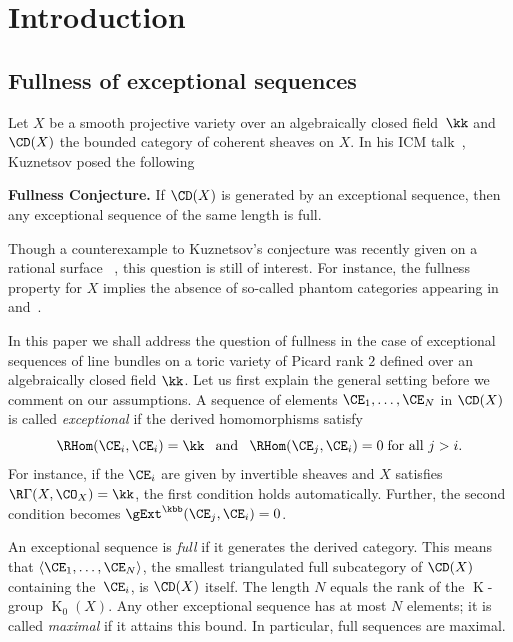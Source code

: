 \section{Introduction}
\label{sec:Intro}

\subsection{Fullness of exceptional sequences}
\label{subsubsec:ExExSeq}
Let $X$ be a smooth projective variety over 
{an algebraically closed field~$\kk$} 
and $\CD(X)$ the bounded category of coherent sheaves 
on $X$. In his ICM talk~\cite{KuznetsovICM}, 
Kuznetsov posed the following

\smallskip 

{\bf Fullness Conjecture.} 
If $\CD(X)$ is generated by an exceptional sequence, 
then any exceptional sequence of the same length is full.

 \smallskip

{Though a counterexample to Kuznetsov's conjecture 
was recently given on a rational surface {~\cite{krah}}, 
this question is still of interest. {For instance, the 
fullness property for $X$} implies the absence of so-called phantom 
categories appearing in~\cite{phantomsGalkin1} and~\cite{Phantom}.}

{In this paper we shall address the question of 
fullness in the case of exceptional sequences of 
line bundles on a toric 
variety of Picard rank $2$ defined over an 
algebraically closed field $\kk$.}
Let us first explain the general setting before we
comment on our assumptions. A sequence of elements 
$\CE_1,\ldots,\CE_N$ in $\CD(X)$ is called 
{\em exceptional} {{if} the derived homomorphisms 
satisfy 
$$
\RHom(\CE_i,\CE_i)=\kk\hspace{0.8em}\mbox{and}\hspace{0.8em}
\RHom(\CE_j,\CE_i)=0\;\mbox{for all }j>i.
$$}For instance, if the $\CE_i$ are 
given by invertible sheaves and $X$ 
satisfies \mbox{$\R\Gamma(X,\CO_X)=\kk$}, the first 
condition holds automatically. Further, the 
second condition becomes $\gExt^\kbb(\CE_j,\CE_i)=0$.

An exceptional sequence is {\em full} if it 
generates the derived category. This means that 
$\langle\CE_1,\ldots,\CE_N\rangle$, the smallest 
triangulated full subcategory of $\CD(X)$ 
containing the~$\CE_i$, is $\CD(X)$ itself. 
The length $N$ equals the rank of 
the $\operatorname{K}$-group $\operatorname{K}_0(X)$. Any other exceptional
sequence has at most $N$ elements; it is called
{\em maximal} if it attains this bound. 
In particular, full sequences are maximal.

